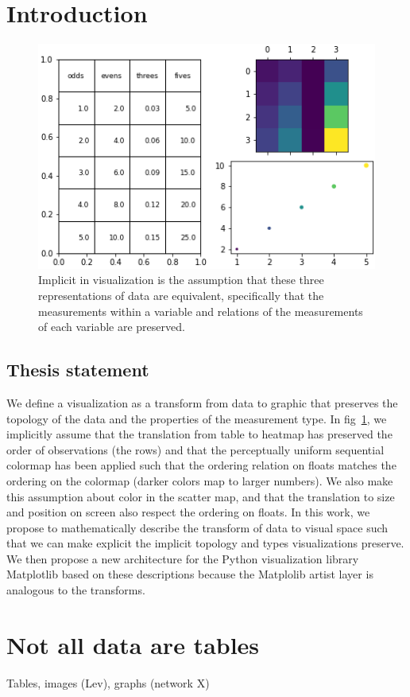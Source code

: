 \documentclass[../main.tex]{subfiles}
\begin{document}
\section{Introduction}
\label{sec:introduction}
\begin{figure}
    \includegraphics[width=.5\textwidth]{figures/intro/viz_same.png}
    \caption[]{Implicit in visualization is the assumption that these three representations of data are equivalent, specifically that the measurements within a variable and relations of the measurements of each variable are preserved. }
    \label{fig:viz_same}
\end{figure}

\subsection{Thesis statement}
We define a visualization as a transform from data to graphic that preserves the topology of the data and the properties of the measurement type. In fig~\ref{fig:viz_same}, we implicitly assume that the translation from table to heatmap has preserved the order of observations (the rows) and that the perceptually uniform sequential colormap has been applied such that the ordering relation on floats matches the ordering on the colormap (darker colors map to larger numbers). We also make this assumption about color in the scatter map, and that the translation to size and position on screen also respect the ordering on floats. In this work, we propose to mathematically describe the transform of data to visual space such that we can make explicit the implicit topology and types visualizations preserve. We then propose a new architecture for the Python visualization library Matplotlib \cite{hunterMatplotlib2DGraphics2007} based on these descriptions because the Matplolib artist layer is analogous to the transforms. 


\section{Not all data are tables}

Tables, images (Lev), graphs (network X)
\end{document}
